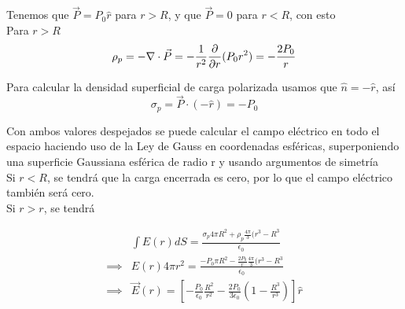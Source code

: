 \begin{solucion}{6}
    
    Tenemos que $\Vec{P} = P_0\hat{r}$ para $r > R$, y que $\Vec{P} = 0$ para $r < R$, con esto\\
    
    Para $r > R$
    \begin{equation}
            \rho_p = -\nabla\cdot\Vec{P}\\
            = -\frac{1}{r^2}\frac{\partial}{\partial r}(P_0r^2)\\
            = -\frac{2P_0}{r}
        \nonumber
    \end{equation}
    
    Para calcular la densidad superficial de carga polarizada usamos que $\hat{n} = -\hat{r}$, así
    \begin{equation}
            \sigma_p = \Vec{P}\cdot(-\hat{r}) = -P_0
        \nonumber
    \end{equation}
    
    Con ambos valores despejados se puede calcular el campo eléctrico en todo el espacio haciendo uso de la Ley de Gauss en coordenadas esféricas, superponiendo una superficie Gaussiana esférica de radio r y usando argumentos de simetría\\
    
    Si $r < R$, se tendrá que la carga encerrada es cero, por lo que el campo eléctrico también será cero.\\
    
    Si $r > r$, se tendrá
    
    \begin{equation}
        \begin{split}
            &\int E(r)dS = \frac{\sigma_p4\pi R^2 + \rho_p \frac{4\pi}{3}(r^3 - R^3}{\epsilon_0}\\
            \implies &E(r) 4\pi r^2= \frac{-P_0\pi R^2 -\frac{2P_0}{r} \frac{4\pi}{3}(r^3 - R^3}{\epsilon_0}\\
            \implies &\Vec E(r) = \left[ -\frac{P_0}{\epsilon_0}\frac{R^2}{r^2} - \frac{2P_0}{3\epsilon_0}\left( 1-\frac{R^3}{r^3} \right)\right]\hat{r}
        \end{split}
        \nonumber
    \end{equation}
    
\end{solucion}

\bigbreak

\newpage